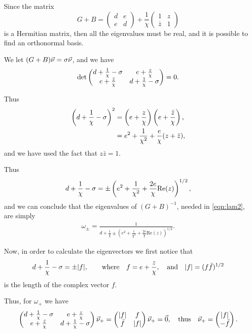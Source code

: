 Since the matrix
% 
\[
  G+B = \begin{pmatrix}d&e\\e&d\end{pmatrix} + \frac{1}{\chi}\begin{pmatrix}1&z\\ \bar{z}&1\end{pmatrix}
\]
% 
is a Hermitian matrix, then all the eigenvalues must be real, and it is possible to find an orthonormal basis.

We let $(G+B)\vec{\nu}=\sigma\vec{\nu}$, and we have
% 
\[
  \det\begin{pmatrix} d+\frac{1}{\chi}-\sigma&e+\frac{z}{\chi}\\ e+\frac{\bar{z}}{\chi}&d+\frac{1}{\chi}-\sigma\end{pmatrix}=0.
\]
% 

Thus
% 
\begin{equation*}
	\begin{split}
		\left(d+\frac{1}{\chi}-\sigma \right)^2 &= \left(e+\frac{z}{\chi} \right)\left(e+\frac{\bar{z}}{\chi} \right),\\
		&= e^2 + \frac{1}{\chi^2} + \frac{e}{\chi}(z+\bar{z}),
	\end{split}
\end{equation*}
%
and we have used the fact that $z\bar{z}=1$.

Thus
% 
\begin{equation*}
	\begin{split}
		d+\frac{1}{\chi}-\sigma =\pm\left( e^2 + \frac{1}{\chi^2} + \frac{2e}{\chi}\mathrm{Re}(z)\right)^{1/2},
	\end{split}
\end{equation*}
%
and we can conclude that the eigenvalues of $(G+B)^{-1}$, needed in \eqref{eqn:lam2}, are simply
% 
\begin{equation*}
	\begin{split}
	  \omega_{\pm} = \frac{1}{d+\frac{1}{\chi}\pm\left( e^2 + \frac{1}{\chi^2} + \frac{2e}{\chi}\mathrm{Re}(z)\right)^{1/2}}.
	\end{split}
\end{equation*}
%

Now, in order to calculate the eigenvectors we first notice that
% 
\[
  d+\frac{1}{\chi}-\sigma = \pm|f|,\qquad\text{where}\quad f=e+\frac{z}{\chi},\quad\text{and}\quad |f|=(f\bar{f})^{1/2}
\]
% 
is the length of the complex vector $f$.

Thus, for $\omega_+$ we have
% 
\[
  \begin{pmatrix} d+\frac{1}{\chi}-\sigma&e+\frac{z}{\chi}\\ e+\frac{\bar{z}}{\chi}&d+\frac{1}{\chi}-\sigma\end{pmatrix}\vec{\nu}_+=\begin{pmatrix} |f|&f\\ \bar{f}&|f|\end{pmatrix}\vec{\nu}_+ = \vec{0},\quad\text{thus}\quad \vec{\nu}_+ = \begin{pmatrix}|f|\\ -\bar{f} \end{pmatrix}.
\]
% 

